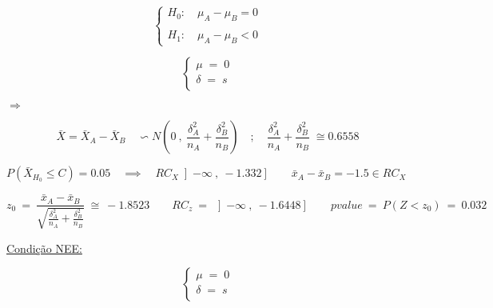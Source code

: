 \newline
\vspace{1cm}
\newline
\begin{minipage}[l]{0pt}
	$$\left\lbrace\begin{array}{l}
		H_0: \quad \mu_A-\mu_B=0 \\
		\\
		H_1: \quad \mu_A-\mu_B<0
	\end{array}\right.$$
\end{minipage}
\newline
\vspace{1cm}
\newline
\begin{minipage}[l]{0pt}
	$$\left\lbrace\begin{array}{c}
		\mu \;=\; 0 \\
		\delta \;=\; s \\
	\end{array}\right.$$
\end{minipage}
\hspace{3cm} $\Longrightarrow$ \hspace{1cm}
\begin{minipage}[l]{0pt}
	\[\bar{X}=\bar{X}_A-\bar{X}_B \quad \backsim N \left( 0\:,\: \frac{\delta_A^2}{n_A}+\frac{\delta_B^2}{n_B} \right) \quad ; \quad \frac{\delta_A^2}{n_A}+\frac{\delta_B^2}{n_B}\;\cong0.6558 \]
\end{minipage}
\newline
\vspace{1cm}
\newline
$P(\bar{X}_{H_0} \leqslant C)=0.05 \quad \implies \quad RC_X\left] -\infty \:,\: -1.332 \right] \qquad \bar{x}_A-\bar{x}_B=-1.5 \in RC_X $
\newline
\vspace{1cm}
\newline
\begin{minipage}[l]{0pt}
	\[  z_0\:=\: \frac{\bar{x}_A-\bar{x}_B}{\sqrt{\frac{\delta_A^2}{n_A}+\frac{\delta_B^2}{n_B}}}\:\cong\: -1.8523 \qquad
	RC_z \:=\: \left] -\infty \:,\: -1.6448 \right]  \qquad
	pvalue \:=\: P(Z<z_0) \:=\: 0.032 \]
\end{minipage}
\newline
\vspace{1cm}
\newline
\hspace*{5cm} \underline{Condição NEE:}\\
\begin{minipage}[l]{0pt}
	$$\left\lbrace\begin{array}{c}
		\mu \;=\; 0 \\
		\delta \;=\; s \\
	\end{array}\right.$$
\end{minipage}

